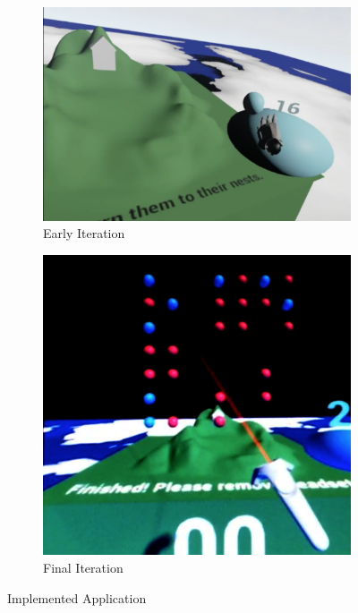\documentclass[12pt]{article}
\begin{document}
\begin{figure}
\centering
\begin{subfigure}{.6\textwidth}
  \centering
  \includegraphics[width=.95\linewidth]{earlydemo.png}
  \caption{Early Iteration}
\end{subfigure}%
\begin{subfigure}{.4\textwidth}
  \centering
  \includegraphics[width=1\linewidth]{finalinterface.png}
  \caption{Final Iteration}
\end{subfigure}
\caption{Implemented Application}
\end{figure}
\end{document}
